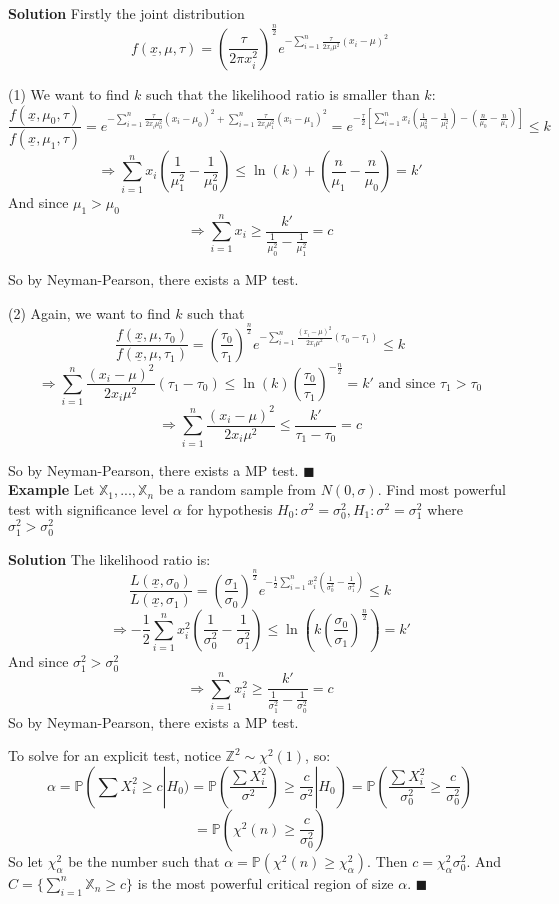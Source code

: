 \textbf{Solution} Firstly the joint distribution
$$f(\underline{x}, \mu, \tau) = (\frac{\tau}{2\pi x_i^2})^\frac{n}{2} e^{-\sum_{i=1}^n\frac{\tau}{2x_i\mu^2}(x_i-\mu)^2}$$

(1) We want to find $k$ such that the likelihood ratio is smaller than $k$:
$$\frac{f(\underline{x}, \mu_0, \tau)}{f(\underline{x}, \mu_1, \tau)} 
= e^{-\sum_{i=1}^n\frac{\tau}{2x_i\mu_0^2}(x_i-\mu_0)^2 + \sum_{i=1}^n\frac{\tau}{2x_i\mu_1^2}(x_i-\mu_1)^2}
= e^{-\frac{\tau}{2}[\sum_{i=1}^n x_i (\frac{1}{\mu_0^2} - \frac{1}{\mu_1^2}) - (\frac{n}{\mu_0} - \frac{n}{\mu_1})]} \leq k$$
$$\Rightarrow \sum_{i=1}^n x_i (\frac{1}{\mu_1^2} - \frac{1}{\mu_0^2}) \leq \ln(k) + (\frac{n}{\mu_1} - \frac{n}{\mu_0}) = k'$$
And since  $\mu_1 > \mu_0$
$$\Rightarrow \sum_{i=1}^n x_i \geq \frac{k'}{\frac{1}{\mu_0^2} - \frac{1}{\mu_1^2}} = c$$

So by Neyman-Pearson, there exists a MP test.

(2) Again, we want to find $k$ such that 
$$\frac{f(\underline{x}, \mu, \tau_0)}{f(\underline{x}, \mu, \tau_1)} 
= (\frac{\tau_0}{\tau_1})^{\frac{n}{2}} e^{-\sum_{i=1}^n\frac{(x_i-\mu)^2}{2x_i\mu^2}(\tau_0 - \tau_1)} \leq k$$
$$ \Rightarrow \sum_{i=1}^n\frac{(x_i-\mu)^2}{2x_i\mu^2}(\tau_1 - \tau_0) \leq \ln(k)  (\frac{\tau_0}{\tau_1})^{-\frac{n}{2}} = k' \text{ and since } \tau_1 > \tau_0$$
$$\Rightarrow  \sum_{i=1}^n\frac{(x_i-\mu)^2}{2x_i\mu^2} \leq \frac{k'}{\tau_1 - \tau_0} = c $$

So by Neyman-Pearson, there exists a MP test. $\blacksquare$\\

\textbf{Example} Let $\mathbb{X}_1, ..., \mathbb{X}_n$ be a random sample from $N(0, \sigma)$. Find most powerful test with significance level $\alpha$ for hypothesis $H_0: \sigma^2 = \sigma_0^2, H_1: \sigma^2 = \sigma_1^2$ where $\sigma_1^2 > \sigma_0^2$

\textbf{Solution} The likelihood ratio is:
$$\frac{L(\underline{x}, \sigma_0)}{L(\underline{x}, \sigma_1)} = (\frac{\sigma_1}{\sigma_0})^\frac{n}{2}e^{-\frac{1}{2}\sum_{i=1}^n x_i^2 (\frac{1}{\sigma_0^2} - \frac{1}{\sigma_1^2})} \leq k$$
$$\Rightarrow -\frac{1}{2}\sum_{i=1}^n x_i^2 (\frac{1}{\sigma_0^2} - \frac{1}{\sigma_1^2}) \leq \ln(k (\frac{\sigma_0}{\sigma_1})^\frac{n}{2}) = k'$$
And since $\sigma_1^2 > \sigma_0^2$
$$\Rightarrow \sum_{i=1}^n x_i^2 \geq \frac{k'}{\frac{1}{\sigma_1^2} - \frac{1}{\sigma_0^2}} = c$$
So by Neyman-Pearson, there exists a MP test.

To solve for an explicit test, notice $\mathbb{Z}^2 \sim \chi^2(1)$, so:
$$\alpha = \mathbb{P}(\sum X_i^2 \geq c | H_0 ) = \mathbb{P}(\frac{\sum X_i^2}{\sigma^2}) \geq \frac{c}{\sigma^2} | H_0 ) = \mathbb{P}(\frac{\sum X_i^2}{\sigma_0^2} \geq \frac{c}{\sigma_0^2})$$
$$= \mathbb{P}(\chi^2(n) \geq \frac{c}{\sigma_0^2})$$
So let $\chi^2_\alpha$ be the number such that $\alpha = \mathbb{P}(\chi^2(n) \geq \chi_\alpha^2)$. Then $c = \chi_\alpha^2 \sigma_0^2$. And $C = \{ \sum_{i=1}^n \mathbb{X}_n \geq c \}$ is the most powerful critical region of size $\alpha$. $\blacksquare$\\

